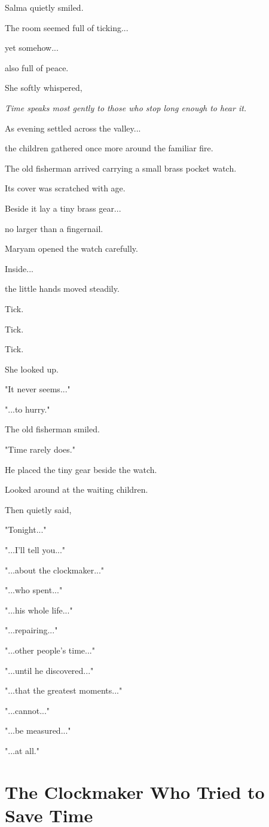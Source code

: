 \documentclass[12pt,openany]{book}
\begin{document}
Salma quietly smiled.

The room seemed full of ticking...

yet somehow...

also full of peace.

She softly whispered,

\emph{Time speaks most gently to those who stop long enough to hear it.}

As evening settled across the valley...

the children gathered once more around the familiar fire.

The old fisherman arrived carrying a small brass pocket watch.

Its cover was scratched with age.

Beside it lay a tiny brass gear...

no larger than a fingernail.

Maryam opened the watch carefully.

Inside...

the little hands moved steadily.

Tick.

Tick.

Tick.

She looked up.

"It never seems..."

"...to hurry."

The old fisherman smiled.

"Time rarely does."

He placed the tiny gear beside the watch.

Looked around at the waiting children.

Then quietly said,

"Tonight..."

"...I'll tell you..."

"...about the clockmaker..."

"...who spent..."

"...his whole life..."

"...repairing..."

"...other people's time..."

"...until he discovered..."

"...that the greatest moments..."

"...cannot..."

"...be measured..."

"...at all."
\section*{The Clockmaker Who Tried to Save Time}
\end{document}
